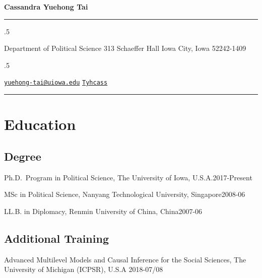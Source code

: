 \documentclass[10.5pt,]{article}
\providecommand{\tightlist}{%
	\setlength{\itemsep}{0pt}\setlength{\parskip}{0pt}}
\renewenvironment{itemize}{
	\begin{list}{}{
			\setlength{\leftmargin}{1.5em}
		}
	}{
	\end{list}
}
\begin{document}
	
	
	\centerline{\huge \bf Cassandra Yuehong Tai}
	
	
	
	\vspace{2 mm}
	
	\hrule
	
	\vspace{2 mm}
	
	
	\moveleft.5\hoffset\centerline{Department of Political Science 313 Schaeffer Hall Iowa City, Iowa
52242-1409}
	\moveleft.5\hoffset\centerline{ {\FA\faEnvelope} \hspace{1 mm} \href{mailto:}{\tt \href{mailto:yuehong-tai@uiowa.edu}{\nolinkurl{yuehong-tai@uiowa.edu}}} \hspace{1 mm}  {\FA\faGithub} \hspace{1 mm} \href{http://github.com/Tyhcass}{\tt Tyhcass} \hspace{1 mm}     }
	
	\vspace{2 mm}
	
	\hrule
	
		
	\section{Education}\label{education}

\subsection{Degree}\label{degree}

\begin{itemize}
\tightlist
\item
  Ph.D.~Program in Political Science, The University of Iowa,
  U.S.A.\hfill 2017-Present
\item
  MSc in Political Science, Nanyang Technological University,
  Singapore\hfill 2008-06
\item
  LL.B. in Diplomacy, Renmin University of China, China\hfill 2007-06
\end{itemize}

\subsection{Additional Training}\label{additional-training}

\begin{itemize}
\tightlist
\item
  Advanced Multilevel Models and Causal Inference for the Social
  Sciences, The University of Michigan (ICPSR), U.S.A \hfill 2018-07/08
\end{itemize}
\end{document}
